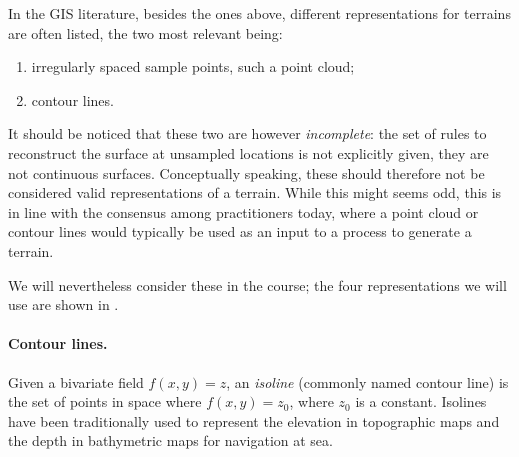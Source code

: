 In the GIS literature, besides the ones above, different representations for terrains are often listed, the two most relevant being:
\begin{enumerate}
  \item irregularly spaced sample points, such a point cloud; 
  \item contour lines.
\end{enumerate}
It should be noticed that these two are however \emph{incomplete}: the set of rules to reconstruct the surface at unsampled locations is not explicitly given, they are not continuous surfaces.
Conceptually speaking, these should therefore not be considered valid representations of a terrain.
While this might seems odd, this is in line with the consensus among practitioners today, where a point cloud or contour lines would typically be used as an input to a process to generate a terrain.

We will nevertheless consider these in the course; the four representations we will use are shown in .

%

\paragraph{Contour lines.}%

Given a bivariate field $f(x,y) = z$, an \emph{isoline} (commonly named contour line) is the set of points in space where $f(x,y) = z_0$, where $z_0$ is a constant. 
Isolines have been traditionally used to represent the elevation in topographic maps and the depth in bathymetric maps for navigation at sea. 

%

